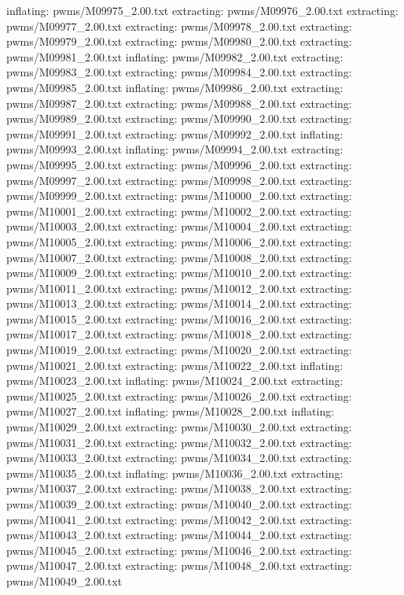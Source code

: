 \documentclass[letterpaper,10pt,english]{sphinxmanual}
\begin{document}
{\begin{sphinxVerbatim}[commandchars=\\\{\}]
  inflating: pwms/M09975\_2.00.txt
 extracting: pwms/M09976\_2.00.txt
 extracting: pwms/M09977\_2.00.txt
 extracting: pwms/M09978\_2.00.txt
 extracting: pwms/M09979\_2.00.txt
 extracting: pwms/M09980\_2.00.txt
 extracting: pwms/M09981\_2.00.txt
  inflating: pwms/M09982\_2.00.txt
 extracting: pwms/M09983\_2.00.txt
 extracting: pwms/M09984\_2.00.txt
 extracting: pwms/M09985\_2.00.txt
  inflating: pwms/M09986\_2.00.txt
 extracting: pwms/M09987\_2.00.txt
 extracting: pwms/M09988\_2.00.txt
 extracting: pwms/M09989\_2.00.txt
 extracting: pwms/M09990\_2.00.txt
 extracting: pwms/M09991\_2.00.txt
 extracting: pwms/M09992\_2.00.txt
  inflating: pwms/M09993\_2.00.txt
  inflating: pwms/M09994\_2.00.txt
 extracting: pwms/M09995\_2.00.txt
 extracting: pwms/M09996\_2.00.txt
 extracting: pwms/M09997\_2.00.txt
 extracting: pwms/M09998\_2.00.txt
 extracting: pwms/M09999\_2.00.txt
 extracting: pwms/M10000\_2.00.txt
 extracting: pwms/M10001\_2.00.txt
 extracting: pwms/M10002\_2.00.txt
 extracting: pwms/M10003\_2.00.txt
 extracting: pwms/M10004\_2.00.txt
 extracting: pwms/M10005\_2.00.txt
 extracting: pwms/M10006\_2.00.txt
 extracting: pwms/M10007\_2.00.txt
 extracting: pwms/M10008\_2.00.txt
 extracting: pwms/M10009\_2.00.txt
 extracting: pwms/M10010\_2.00.txt
 extracting: pwms/M10011\_2.00.txt
 extracting: pwms/M10012\_2.00.txt
 extracting: pwms/M10013\_2.00.txt
 extracting: pwms/M10014\_2.00.txt
 extracting: pwms/M10015\_2.00.txt
 extracting: pwms/M10016\_2.00.txt
 extracting: pwms/M10017\_2.00.txt
 extracting: pwms/M10018\_2.00.txt
 extracting: pwms/M10019\_2.00.txt
 extracting: pwms/M10020\_2.00.txt
 extracting: pwms/M10021\_2.00.txt
 extracting: pwms/M10022\_2.00.txt
  inflating: pwms/M10023\_2.00.txt
  inflating: pwms/M10024\_2.00.txt
 extracting: pwms/M10025\_2.00.txt
 extracting: pwms/M10026\_2.00.txt
 extracting: pwms/M10027\_2.00.txt
  inflating: pwms/M10028\_2.00.txt
  inflating: pwms/M10029\_2.00.txt
 extracting: pwms/M10030\_2.00.txt
 extracting: pwms/M10031\_2.00.txt
 extracting: pwms/M10032\_2.00.txt
 extracting: pwms/M10033\_2.00.txt
 extracting: pwms/M10034\_2.00.txt
 extracting: pwms/M10035\_2.00.txt
  inflating: pwms/M10036\_2.00.txt
 extracting: pwms/M10037\_2.00.txt
 extracting: pwms/M10038\_2.00.txt
 extracting: pwms/M10039\_2.00.txt
 extracting: pwms/M10040\_2.00.txt
 extracting: pwms/M10041\_2.00.txt
 extracting: pwms/M10042\_2.00.txt
 extracting: pwms/M10043\_2.00.txt
 extracting: pwms/M10044\_2.00.txt
 extracting: pwms/M10045\_2.00.txt
 extracting: pwms/M10046\_2.00.txt
 extracting: pwms/M10047\_2.00.txt
 extracting: pwms/M10048\_2.00.txt
 extracting: pwms/M10049\_2.00.txt

\end{sphinxVerbatim}}
\end{document}
